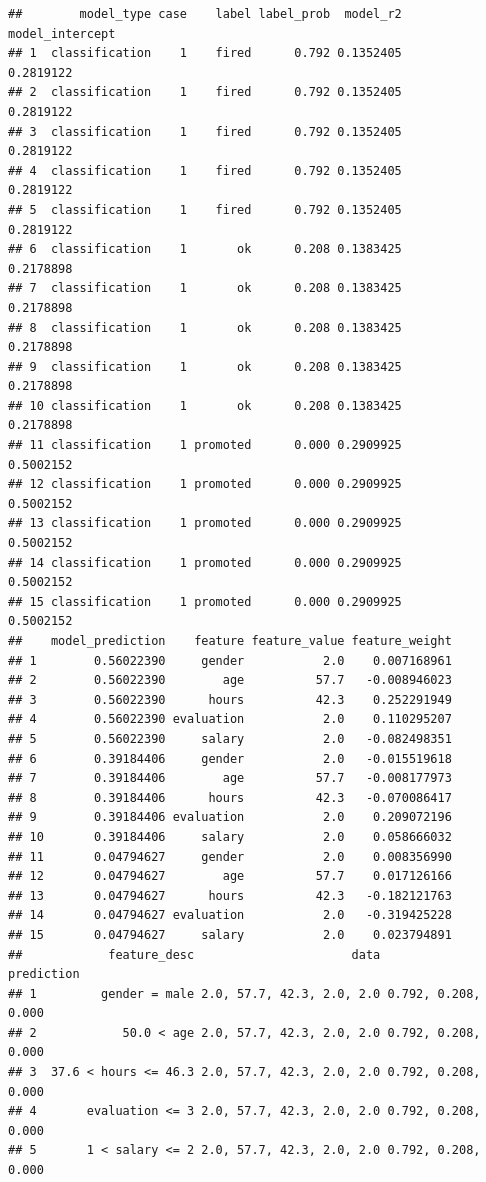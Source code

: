 \documentclass[]{book}
\theoremstyle{definition}
\theoremstyle{definition}
\theoremstyle{definition}
\theoremstyle{remark}
\begin{document}
\begin{verbatim}
##        model_type case    label label_prob  model_r2 model_intercept
## 1  classification    1    fired      0.792 0.1352405       0.2819122
## 2  classification    1    fired      0.792 0.1352405       0.2819122
## 3  classification    1    fired      0.792 0.1352405       0.2819122
## 4  classification    1    fired      0.792 0.1352405       0.2819122
## 5  classification    1    fired      0.792 0.1352405       0.2819122
## 6  classification    1       ok      0.208 0.1383425       0.2178898
## 7  classification    1       ok      0.208 0.1383425       0.2178898
## 8  classification    1       ok      0.208 0.1383425       0.2178898
## 9  classification    1       ok      0.208 0.1383425       0.2178898
## 10 classification    1       ok      0.208 0.1383425       0.2178898
## 11 classification    1 promoted      0.000 0.2909925       0.5002152
## 12 classification    1 promoted      0.000 0.2909925       0.5002152
## 13 classification    1 promoted      0.000 0.2909925       0.5002152
## 14 classification    1 promoted      0.000 0.2909925       0.5002152
## 15 classification    1 promoted      0.000 0.2909925       0.5002152
##    model_prediction    feature feature_value feature_weight
## 1        0.56022390     gender           2.0    0.007168961
## 2        0.56022390        age          57.7   -0.008946023
## 3        0.56022390      hours          42.3    0.252291949
## 4        0.56022390 evaluation           2.0    0.110295207
## 5        0.56022390     salary           2.0   -0.082498351
## 6        0.39184406     gender           2.0   -0.015519618
## 7        0.39184406        age          57.7   -0.008177973
## 8        0.39184406      hours          42.3   -0.070086417
## 9        0.39184406 evaluation           2.0    0.209072196
## 10       0.39184406     salary           2.0    0.058666032
## 11       0.04794627     gender           2.0    0.008356990
## 12       0.04794627        age          57.7    0.017126166
## 13       0.04794627      hours          42.3   -0.182121763
## 14       0.04794627 evaluation           2.0   -0.319425228
## 15       0.04794627     salary           2.0    0.023794891
##            feature_desc                      data          prediction
## 1         gender = male 2.0, 57.7, 42.3, 2.0, 2.0 0.792, 0.208, 0.000
## 2            50.0 < age 2.0, 57.7, 42.3, 2.0, 2.0 0.792, 0.208, 0.000
## 3  37.6 < hours <= 46.3 2.0, 57.7, 42.3, 2.0, 2.0 0.792, 0.208, 0.000
## 4       evaluation <= 3 2.0, 57.7, 42.3, 2.0, 2.0 0.792, 0.208, 0.000
## 5       1 < salary <= 2 2.0, 57.7, 42.3, 2.0, 2.0 0.792, 0.208, 0.000

\end{verbatim}
\end{document}
